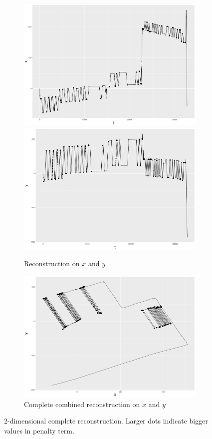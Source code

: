 \begin{figure}
  \centering
 \begin{subfigure}{\textwidth}
     \centering
     \includegraphics[width=0.45\linewidth]{Chapters/02TractorSplineTheory/plot/ggplot/ggRealdataXYPenaltyPathofX.pdf}
     \includegraphics[width=0.45\linewidth]{Chapters/02TractorSplineTheory/plot/ggplot/ggRealdataXYPenaltyPathofY.pdf}
     \caption{Reconstruction on $x$ and $y$}
     \end{subfigure}
     \begin{subfigure}{\textwidth}
     \centering
     \includegraphics[width=0.9\linewidth]{Chapters/02TractorSplineTheory/plot/ggplot/ggRealdataXYPenaltyPathofXY.pdf}
     \caption{Complete combined reconstruction on $x$ and $y$}
     \end{subfigure}
 \caption{2-dimensional complete reconstruction. Larger dots indicate bigger values in penalty term.}\label{completecombind2dxy}
\end{figure}

